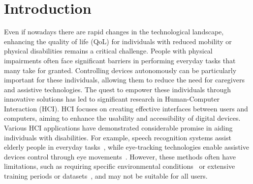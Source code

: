 \chapter{Introduction}\label{ch:introduction}



Even if nowadays there are rapid changes in the technological landscape, enhancing the quality of life (QoL) for individuals with reduced mobility or physical disabilities remains a critical challenge. 
People with physical impairments often face significant barriers in performing everyday tasks that many take for granted. 
Controlling devices autonomously can be particularly important for these individuals, allowing them to reduce the need for caregivers and assistive technologies.
The quest to empower these individuals through innovative solutions has led to significant research in Human-Computer Interaction (HCI).
HCI focuses on creating effective interfaces between users and computers, aiming to enhance the usability and accessibility of digital devices. 
Various HCI applications have demonstrated considerable promise in aiding individuals with disabilities. 
For example, speech recognition systems assist elderly people in everyday tasks~\cite{10444265}, while eye-tracking technologies enable assistive devices control through eye movements~\cite{10560196}. 
However, these methods often have limitations, such as requiring specific environmental conditions~\cite{khazaleh2024investigation} or extensive training periods or datasets~\cite{ke2024using}, and may not be suitable for all users.

